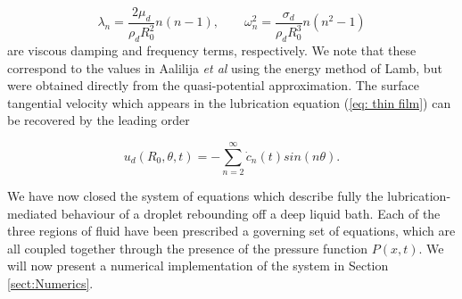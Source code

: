 \begin{equation}
    \lambda_n = \frac{2 \mu_d}{\rho_d R_0^2}n(n-1), \qquad \omega_n^2 = \frac{\sigma_d }{\rho_d R_0^3}n(n^2-1) 
\end{equation}
are viscous damping and frequency terms, respectively. We note that these correspond to the values in Aalilija \textit{et al}\cite{aalilija2020analytical} using the energy method of Lamb\cite{lamb1924hydrodynamics}, but were obtained directly from the quasi-potential approximation. The surface tangential velocity which appears in the lubrication equation (\ref{eq: thin film}) can be recovered by the leading order 

\begin{equation}
    u_d(R_0, \theta, t) = -\sum_{n=2}^\infty \dot{c}_n(t) sin(n\theta).
\end{equation}

We have now closed the system of equations which describe fully the lubrication-mediated behaviour of a droplet rebounding off a deep liquid bath. Each of the three regions of fluid have been prescribed a governing set of equations, which are all coupled together through the presence of the pressure function $P(x,t)$. We will now present a numerical implementation of the system in Section \ref{sect:Numerics}.


